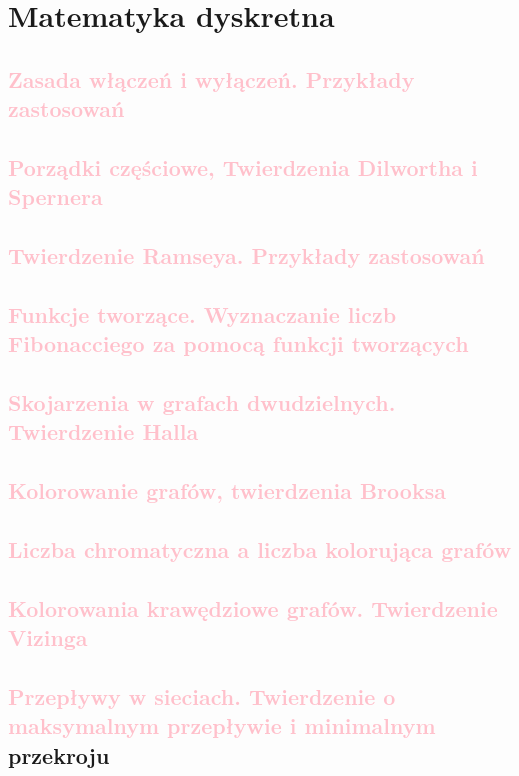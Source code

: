 \chapter{Matematyka dyskretna} 


\section{\textcolor{pink}{Zasada włączeń i wyłączeń. Przykłady zastosowań}}


\section{\textcolor{pink}{Porządki częściowe, Twierdzenia Dilwortha i Spernera}}


\section{\textcolor{pink}{Twierdzenie Ramseya. Przykłady zastosowań}}


\section{\textcolor{pink}{Funkcje tworzące. Wyznaczanie liczb Fibonacciego za pomocą funkcji tworzących}}


\section{\textcolor{pink}{Skojarzenia w grafach dwudzielnych. Twierdzenie Halla}}


\section{\textcolor{pink}{Kolorowanie grafów, twierdzenia Brooksa}}


\section{\textcolor{pink}{Liczba chromatyczna a liczba kolorująca grafów}}


\section{\textcolor{pink}{Kolorowania krawędziowe grafów. Twierdzenie Vizinga}}


\section{\textcolor{pink}{Przepływy w sieciach. Twierdzenie o maksymalnym przepływie i minimalnym}
przekroju}
